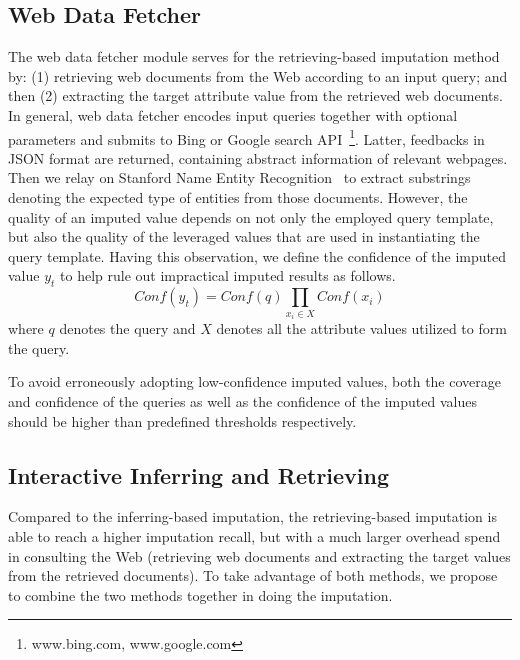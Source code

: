 \documentclass[sigconf]{acmart}
\begin{document}
\subsection{Web Data Fetcher}
The web data fetcher module serves for the retrieving-based imputation method by: (1) retrieving web documents from the Web according to an input query; and then (2) extracting the target attribute value from the retrieved web documents.
%
In general, web data fetcher encodes input queries together with optional parameters and submits to Bing or Google search API~\footnote{www.bing.com, www.google.com}. Latter, feedbacks in JSON format are returned, containing abstract information of relevant webpages. Then we relay on Stanford Name Entity Recognition~\cite{mikheev1999named} to extract substrings denoting the expected type of entities from those documents.
%
However, the quality of an imputed value depends on not only the employed query template, but also the quality of the leveraged values that are used in instantiating the query template. Having this observation, we define the confidence of the imputed value $y_t$ to help rule out impractical imputed results as follows.
\begin{equation}
Conf(y_t)=Conf(q)\prod_{x_i \in X}Conf(x_i)
\end{equation}
where $q$ denotes the query and $X$ denotes all the  attribute values utilized to form the query.

To avoid erroneously adopting low-confidence imputed values, both the coverage and confidence of the queries as well as the confidence of the imputed values should be higher than predefined thresholds respectively.
\subsection{Interactive Inferring and Retrieving}
Compared to the inferring-based imputation, the retrieving-based imputation is able to reach a higher imputation recall, but with a much larger overhead spend in consulting the Web (retrieving web documents and extracting the target values from the retrieved documents).
%
To take advantage of both methods, we propose to combine the two methods together in doing the imputation.
\end{document}
